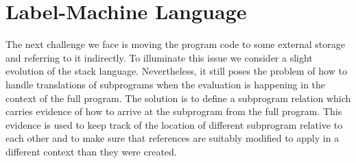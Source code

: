 \documentclass[12pt]{article}
\newcommand{\nil}{[]}
\newcommand{\h}[1]{\hat{#1}}
\renewcommand{\rule}{\textsc}
\newcommand{\sg}{\sigma}
\renewcommand{\P}{\mathcal{P}}
\newcommand{\n}[1]{\overline{#1}}
\newcommand{\cl}[2]{\{ #1 ; #2 \}}
\newcommand{\judgement}[1]{\noindent \framebox{#1}}
\newcommand{\ninf}[1]{\AxiomC{#1}}
\newcommand{\uinf}[1]{\UnaryInfC{#1}}
\newcommand{\binf}[1]{\BinaryInfC{#1}}
\newcommand{\ax}[1]{\ninf{} \uinf{#1}}
\newcommand{\leftl}[1]{\LeftLabel{#1\;}}
\newcommand{\tr}[2]{\ensuremath{#1 \rhd #2}}
\newcommand{\tracc}[3]{\ensuremath{#1 \circ #2 \rhd #3}}
\newcommand{\hev}[3]{\ensuremath{#1 \vdash #2 \Downarrow #3}}
\newcommand{\ssev}[4]{\ensuremath{\langle #1; #2 \rangle \rightarrow^* \langle #3; #4 \rangle}}
\newcommand{\fr}[2]{\langle #1; #2 \rangle}
\newcommand{\cor}[2]{\ensuremath{#1 \rightsquigarrow #2}}
\newcommand{\scomp}{\cor}
\newcommand{\e}{e} %
\renewcommand{\b}{b} %
\renewcommand{\v}{v} %
\newcommand{\s}{s}
\renewcommand{\ss}{p} %
\newcommand{\w}{w}
\renewcommand{\h}{h}
\newcounter{statementcounter}
\newtheorem{lemma}[statementcounter]{Lemma}
\begin{document}
%
%
%
%
%
%
%

\section*{Label-Machine Language}
The next challenge we face is moving the program code to some external storage and referring to it indirectly.
To illuminate this issue we consider a slight evolution of the stack language.
Nevertheless, it still poses the problem of how to handle translations of subprograms when the evaluation is happening in the context of the full program.
The solution is to define a subprogram relation which carries evidence of how to arrive at the subprogram from the full program.
This evidence is used to keep track of the location of different subprogram relative to each other and to make sure that references are suitably modified to apply in a different context than they were created.
\end{document}
